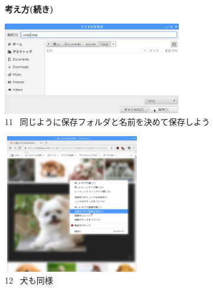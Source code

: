\documentclass[a4paper,12pt]{jarticle}
\begin{document}
\begin{figure}[t]
\textbf{考え方(続き)}



\centering
\begin{minipage}{\textwidth}
\begin{minipage}{7.882cm}
\includegraphics[width=7.811cm,height=4.053cm]{textbook-img103.png}\\
11 \ 同じように保存フォルダと名前を決めて保存しよう
\end{minipage}
\begin{minipage}{2.582cm}
\end{minipage}
\begin{minipage}{6.257cm}
\includegraphics[width=6.041cm,height=6.094cm]{textbook-img092.png}\\
12 \ 犬も同様
\end{minipage}
\end{minipage}


\bigskip



\end{figure}
\end{document}
